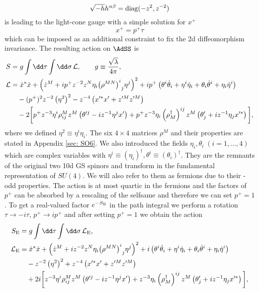 %
%
\begin{equation}
\sqrt{-h}h^{\alpha\beta} = {\rm diag}(-z^{2},z^{-2})
\end{equation}
%
%
is leading to the light-cone gauge with a simple solution for $x^{+}$
%
%
\begin{equation}
x^{+} = p^{+}\tau
\end{equation}
%
%
which can be imposed as an additional constraint to fix the 2d  diffeomorphism invariance. The resulting action on $\AdSS$ is
%
%
\begin{align}
S &= g \int \dd \tau \int \dd \sigma \, \mathcal{L}, \qquad g\equiv \frac{\sqrt{\lambda}}{4\pi},  \\
%
\mathcal{L} &= \dot{x}^{*}\dot{x} + \left( \dot{z}^{M} + ip^{+}z^{-2}z^{N}\eta_{i} {\left(\rho^{MN}\right)^{i}}_{j} \eta^{j}\right)^{2} +ip^{+}\left( \theta^{i}\dot{\theta}_{i} + \eta^{i}\dot{\eta}_{i} +\theta_{i}\dot{\theta}^{i} + \eta_{i}\dot{\eta}^{i}\right) \notag \\
%
&\quad -(p^{+})^{2}z^{-2}\left(\eta^{2}\right)^{2} -z^{-4}\left(x'^{*}x' +z'^{M}z'^{M}\right) \notag \\
%
&\quad -2 \bigg[ p^{+}z^{-3}\eta^{i} \rho^{M}_{ij} z^{M} \left( \theta'^{j} -iz^{-1}\eta^{j}x'\right) +  p^{+}z^{-3}\eta_{i}\left(\rho^{\dagger}_{M}\right)^{ij}z^{M} \left(\theta'_{j}+iz^{-1}\eta_{j}x'^{*}\right) \bigg], \notag
\end{align}
%
%
where we defined $\eta^{2}\equiv \eta^{i}\eta_{i}$. The six $4 \times 4$ matrices $\rho^{M}$ and their properties are stated in Appendix \ref{sec: SO6}. We also introduced the fields $\eta_{i}, \theta_{i}\; {(i=1,\ldots,4)}$ which  are complex  variables with ${\eta^{i}\equiv (\eta_{i})^{\dagger}},{ \theta^{i}\equiv (\theta_{i})^{\dagger}}$. They are the remnants of the original two 10d  GS spinors and transform in the fundamental representation of $SU(4)$. We will also refer to them as fermions due to their -odd properties. The action is at most quartic in the fermions and the factors of $p^{+}$ can be absorbed by a rescaling of the selfsame and therefore we can set $p^{+}=1$. To get a real-valued  factor $e^{-S_{\rm E}}$ in the path integral we perform a  rotation ${\tau \to -i\tau}$, ${p^{+}\to ip^{+}}$ and after setting $p^{+}=1$ we obtain the  action
%
%
\begin{align}
S_{\rm E} &= g \int \dd\tau \int \dd\sigma \, \mathcal{L}_{\rm E},  \\
%
\mathcal{L}_{\rm E} &=\dot{x}^{*}\dot{x} + \left( \dot{z}^{M} + iz^{-2}z^{N}\eta_{i} {\left(\rho^{MN}\right)^{i}}_{j} \eta^{j}\right)^{2} +i\left( \theta^{i}\dot{\theta}_{i} + \eta^{i}\dot{\eta}_{i} +\theta_{i}\dot{\theta}^{i} + \eta_{i}\dot{\eta}^{i}\right) \notag \\
%
&\quad -z^{-2}\left(\eta^{2}\right)^{2} +z^{-4}\left(x'^{*}x' +z'^{M}z'^{M}\right) \notag \\
%
&\quad +2i \bigg[ z^{-3}\eta^{i} \rho^{M}_{ij} z^{M} \left( \theta'^{j} -iz^{-1}\eta^{j}x'\right) + z^{-3}\eta_{i}\left(\rho^{\dagger}_{M}\right)^{ij}z^{M} \left(\theta'_{j}+iz^{-1}\eta_{j}x'^{*}\right) \bigg], \notag
\end{align}
